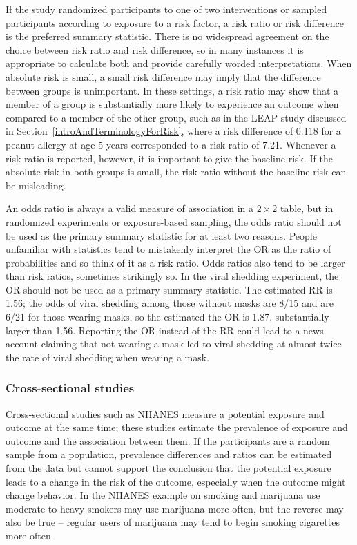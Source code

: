 If the study randomized participants to one of two interventions or sampled participants according to exposure to a risk factor, a risk ratio or risk difference is the preferred summary statistic.  There is no widespread agreement on the choice between risk ratio and risk difference, so in many instances it is appropriate to calculate both and provide carefully worded interpretations. When absolute risk is small, a small risk difference may imply that the difference between groups is unimportant. In these settings, a risk ratio may show that a member of a group is substantially more likely to experience an outcome when compared to a member of the other group, such as in the LEAP study discussed in Section~\ref{introAndTerminologyForRisk}, where a risk difference of 0.118 for a peanut allergy at age 5 years corresponded to a risk ratio of 7.21.  Whenever a risk ratio is reported, however, it is important to give the baseline risk.  If the absolute risk in both groups is small, the risk ratio without the baseline risk can be misleading.

An odds ratio is always a valid measure of association in a $2 \times 2$ table, but in randomized experiments or exposure-based sampling, the odds ratio should not be used as the primary summary statistic for at least two reasons.  People unfamiliar with statistics tend to mistakenly interpret the OR as the ratio of probabilities and so think of it as a risk ratio.  Odds ratios also tend to be larger than risk ratios, sometimes strikingly so.  In the viral shedding experiment, the OR should not be used as a primary summary statistic. The estimated RR is 1.56; the odds of viral shedding among those without masks are 8/15 and are 6/21 for those wearing masks, so the estimated the OR is 1.87, substantially larger than 1.56. Reporting the OR instead of the RR could lead to a news account claiming that not wearing a mask led to viral shedding at almost twice the rate of viral shedding when wearing a mask.

\subsubsection{Cross-sectional studies}

Cross-sectional studies such as NHANES measure a potential exposure and outcome at the same time; these studies estimate the prevalence of exposure and outcome and the association between them.  If the participants are a random sample from a population, prevalence differences and ratios can be estimated from the data but cannot support the conclusion that the potential exposure leads to a change in the risk of the outcome, especially when the outcome might change behavior. In the NHANES example on smoking and marijuana use moderate to heavy smokers may use marijuana more often, but the reverse may also be true -- regular users of marijuana may tend to begin smoking cigarettes more often.

